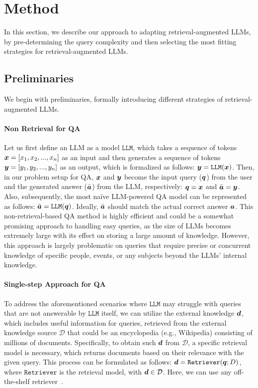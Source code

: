 \section{Method}
In this section, we describe our approach to adapting retrieval-augmented LLMs, by pre-determining the query complexity and then selecting the most fitting strategies for retrieval-augmented LLMs.

\subsection{Preliminaries}
\label{method:pre}
We begin with preliminaries, formally introducing different strategies of retrieval-augmented LLMs.


\paragraph{Non Retrieval for QA}
Let us first define an LLM as a model $\texttt{LLM}$, which takes a sequence of tokens ${\bm{x}} = [x_1, x_2, ..., x_n]$ as an input and then generates a sequence of tokens ${\bm{y}} = [y_1, y_2, ..., y_n]$ as an output, which is formalized as follows: ${\bm{y}} = \texttt{LLM}({\bm{x}})$. Then, in our problem setup for QA, ${\bm{x}}$ and ${\bm{y}}$ become the input query (${\bm{q}}$) from the user and the generated answer ($\bar{{\bm{a}}}$) from the LLM, respectively: ${\bm{q}} = {\bm{x}}$ and $\bar{{\bm{a}}} = {\bm{y}}$. Also, subsequently, the most naïve LLM-powered QA model can be represented as follows: $\bar{{\bm{a}}} = \texttt{LLM}({\bm{q}})$. Ideally, $\bar{{\bm{a}}}$ should match the actual correct answer ${\bm{a}}$. This non-retrieval-based QA method is highly efficient and could be a somewhat promising approach to handling easy queries, as the size of LLMs becomes extremely large with its effect on storing a large amount of knowledge. However, this approach is largely problematic on queries that require precise or concurrent knowledge of specific people, events, or any subjects beyond the LLMs' internal knowledge.



\paragraph{Single-step Approach for QA}
To address the aforementioned scenarios where $\texttt{LLM}$ may struggle with queries that are not answerable by $\texttt{LLM}$ itself, we can utilize the external knowledge ${\bm{d}}$, which includes useful information for queries, retrieved from the external knowledge source $\mathcal{D}$ that could be an encyclopedia (e.g., Wikipedia) consisting of millions of documents. Specifically, to obtain such ${\bm{d}}$ from $\mathcal{D}$, a specific retrieval model is necessary, which returns documents based on their relevance with the given query. This process can be formulated as follows: ${\bm{d}} = \texttt{Retriever}({\bm{q}}; D)$, where $\texttt{Retriever}$ is the retrieval model, with ${\bm{d}} \in \mathcal{D}$. Here, we can use any off-the-shelf retriever~\cite{bm25, DPR}. 

